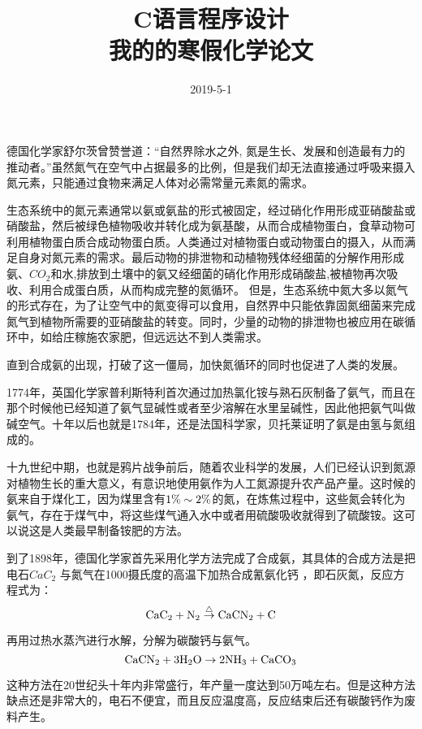 \documentclass[a4paper,12pt]{article}
\begin{document}
\title {C语言程序设计\\我的的寒假化学论文}
\author{}
\date{2019-5-1}
    
\maketitle
 



德国化学家舒尔茨曾赞誉道：“自然界除水之外, 氮是生长、发展和创造最有力的推动者。”虽然氮气在空气中占据最多的比例，但是我们却无法直接通过呼吸来摄入氮元素，只能通过食物来满足人体对必需常量元素氮的需求。

生态系统中的氮元素通常以氨或氨盐的形式被固定，经过硝化作用形成亚硝酸盐或硝酸盐，然后被绿色植物吸收并转化成为氨基酸，从而合成植物蛋白，食草动物可利用植物蛋白质合成动物蛋白质。人类通过对植物蛋白或动物蛋白的摄入，从而满足自身对氮元素的需求。最后动物的排泄物和动植物残体经细菌的分解作用形成氨、$CO_2$和水,排放到土壤中的氨又经细菌的硝化作用形成硝酸盐,被植物再次吸收、利用合成蛋白质，从而构成完整的氮循环。 但是，生态系统中氮大多以氮气的形式存在，为了让空气中的氮变得可以食用，自然界中只能依靠固氮细菌来完成氮气到植物所需要的亚硝酸盐的转变。同时，少量的动物的排泄物也被应用在碳循环中，如给庄稼施农家肥，但远远达不到人类需求。

直到合成氨的出现，打破了这一僵局，加快氮循环的同时也促进了人类的发展。

1774年，英国化学家普利斯特利首次通过加热氯化铵与熟石灰制备了氨气，而且在那个时候他已经知道了氨气显碱性或者至少溶解在水里呈碱性，因此他把氨气叫做碱空气。十年以后也就是1784年，还是法国科学家，贝托莱证明了氨是由氢与氮组成的。

十九世纪中期，也就是鸦片战争前后，随着农业科学的发展，人们已经认识到氮源对植物生长的重大意义，有意识地使用氨作为人工氮源提升农产品产量。这时候的氨来自于煤化工，因为煤里含有$\rm 1\%\sim2\%$的氮，在炼焦过程中，这些氮会转化为氨气，存在于煤气中，将这些煤气通入水中或者用硫酸吸收就得到了硫酸铵。这可以说这是人类最早制备铵肥的方法。

到了1898年，德国化学家首先采用化学方法完成了合成氨，其具体的合成方法是把电石$CaC_2$ 与氮气在1000摄氏度的高温下加热合成氰氨化钙  ，即石灰氮，反应方程式为：
$$
\rm CaC_2 + N_2\overset{\triangle }{\rightarrow}  CaCN_2 + C
$$

再用过热水蒸汽进行水解，分解为碳酸钙与氨气。
$$
\rm CaCN_2+3H_2O \rightarrow2NH_3+CaCO_3
$$

这种方法在20世纪头十年内非常盛行，年产量一度达到50万吨左右。但是这种方法缺点还是非常大的，电石不便宜，而且反应温度高，反应结束后还有碳酸钙作为废料产生。
\end{document}
